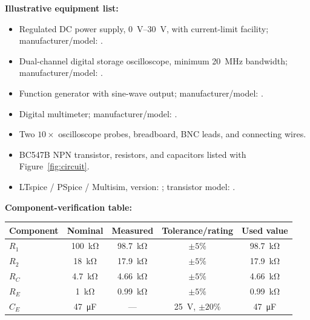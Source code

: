 \documentclass[11pt,a4paper]{article}
\begin{document}
\begin{examplebox}
\textbf{Illustrative equipment list:}
\begin{itemize}
  \item Regulated DC power supply, \SIrange{0}{30}{\volt}, with current-limit
        facility; manufacturer/model: \underline{\hspace{50mm}}.
  \item Dual-channel digital storage oscilloscope, minimum
        \SI{20}{\mega\hertz} bandwidth; manufacturer/model:
        \underline{\hspace{42mm}}.
  \item Function generator with sine-wave output; manufacturer/model:
        \underline{\hspace{44mm}}.
  \item Digital multimeter; manufacturer/model:
        \underline{\hspace{59mm}}.
  \item Two $10\times$ oscilloscope probes, breadboard, BNC leads, and
        connecting wires.
  \item BC547B NPN transistor, resistors, and capacitors listed with
        Figure~\ref{fig:circuit}.
  \item LTspice / PSpice / Multisim, version:
        \underline{\hspace{35mm}}; transistor model:
        \underline{\hspace{35mm}}.
\end{itemize}

\textbf{Component-verification table:}
\begin{center}
\begin{tabular}{lcccc}
\toprule
Component & Nominal & Measured & Tolerance/rating & Used value \\
\midrule
$R_1$ & \SI{100}{\kilo\ohm} & \SI{98.7}{\kilo\ohm} & $\pm5\%$ & \SI{98.7}{\kilo\ohm} \\
$R_2$ & \SI{18}{\kilo\ohm} & \SI{17.9}{\kilo\ohm} & $\pm5\%$ & \SI{17.9}{\kilo\ohm} \\
$R_C$ & \SI{4.7}{\kilo\ohm} & \SI{4.66}{\kilo\ohm} & $\pm5\%$ & \SI{4.66}{\kilo\ohm} \\
$R_E$ & \SI{1}{\kilo\ohm} & \SI{0.99}{\kilo\ohm} & $\pm5\%$ & \SI{0.99}{\kilo\ohm} \\
$C_E$ & \SI{47}{\micro\farad} & --- & \SI{25}{\volt}, $\pm20\%$ & \SI{47}{\micro\farad} \\
\bottomrule
\end{tabular}
\end{center}
\end{examplebox}
\end{document}
